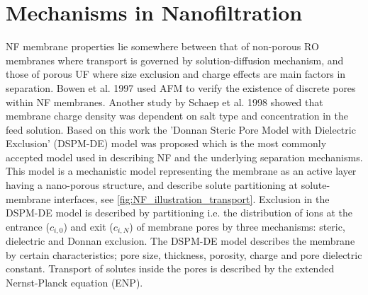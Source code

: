 \section{Mechanisms in Nanofiltration}
\label{ion_afsnit}



NF membrane properties lie somewhere between that of non-porous RO membranes where transport is governed by solution-diffusion mechanism, and those of porous UF where size exclusion and charge effects are main factors in separation. 
Bowen et al. 1997 used AFM to verify the existence of discrete pores within NF membranes. \citep{bowenCharacterisationNanofiltrationMembranes1997}
Another study by Schaep et al. 1998 showed that membrane charge density was dependent on salt type and concentration in the feed solution. \citep{schaepInfluenceIonSize1998} 
Based on this work the 'Donnan Steric Pore Model with Dielectric Exclusion' (DSPM-DE) model was proposed which is the most commonly accepted model used in describing NF and the underlying separation mechanisms. \citep{NanoFiltran_computer_2008} \citep{wangPoreModelNanofiltration2021} 
This model is a mechanistic model representing the membrane as an active layer having a nano-porous structure, and describe solute partitioning at solute-membrane interfaces, see \cref{fig:NF_illustration_transport}.
Exclusion in the DSPM-DE model is described by partitioning i.e. the distribution of ions at the entrance ($c_{i,0}$) and exit ($c_{i,N}$) of membrane pores by three mechanisms: steric, dielectric and Donnan exclusion.
The DSPM-DE model describes the membrane by certain characteristics; pore size, thickness, porosity, charge and pore dielectric constant. 
Transport of solutes inside the pores is described by the extended Nernst-Planck equation (ENP). \citep{wangPoreModelNanofiltration2021}

